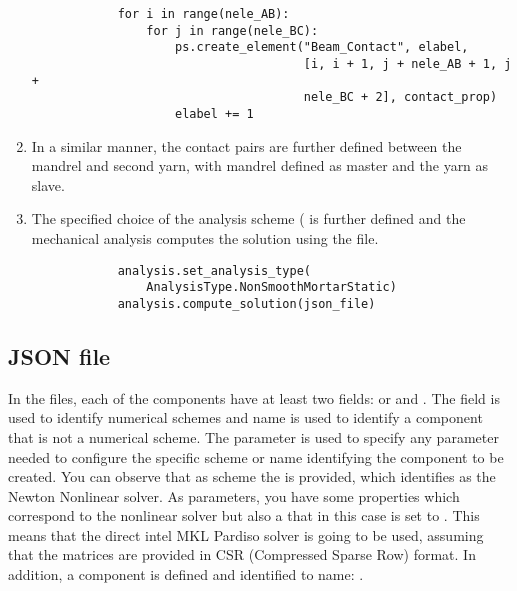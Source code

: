 \begin{enumerate}
        \pythonstyle
        \begin{lstlisting}
            for i in range(nele_AB):
                for j in range(nele_BC):
                    ps.create_element("Beam_Contact", elabel,
                                      [i, i + 1, j + nele_AB + 1, j +
                                      nele_BC + 2], contact_prop)
                    elabel += 1
        \end{lstlisting}
    \item In a similar manner, the contact pairs are further defined between the mandrel and second yarn, with mandrel defined as master and the yarn as slave.
    \item The specified choice of the analysis scheme ( is further defined and the mechanical analysis computes the solution using the  file.
        \pythonstyle
        \begin{lstlisting}
            analysis.set_analysis_type(
                AnalysisType.NonSmoothMortarStatic)
            analysis.compute_solution(json_file)
        \end{lstlisting}    
\end{enumerate}

\subsection{JSON file}
In the  files, each of the components have at least two fields:  or  and . The field  is used to identify numerical schemes and name is used to identify a component that is not a numerical scheme. The  parameter is used to specify any parameter needed to configure the specific scheme or name identifying the component to be created. You can observe that as scheme the  is provided, which identifies as the Newton Nonlinear solver. As parameters, you have some properties which correspond to the nonlinear solver but also a  that in this case is set to . This means that the direct intel MKL Pardiso solver is going to be used, assuming that the matrices are provided in CSR (Compressed Sparse Row) format. In addition, a component  is defined and identified to name: .

